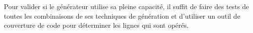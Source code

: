 Pour valider si le générateur utilise sa pleine capacité, il suffit de faire des tests de toutes les combinaisons de ses techniques de génération et d'utiliser un outil de couverture de code pour déterminer les lignes qui sont opérés.





